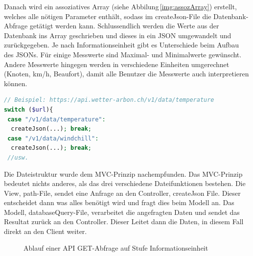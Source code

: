 \noindent
Danach wird ein assoziatives Array (siehe Abbilung\,\ref{img:assozArray}) erstellt, welches alle nötigen Parameter enthält, sodass im createJson-File die Datenbank-Abfrage getätigt werden kann. Schlussendlich werden die Werte aus der Datenbank ins Array geschrieben und dieses in ein JSON umgewandelt und zurückgegeben. Je nach Informationseinheit gibt es Unterschiede beim Aufbau des JSONs. Für einige Messwerte sind Maximal- und Minimalwerte gewünscht. Andere Messwerte hingegen werden in verschiedene Einheiten umgerechnet (Knoten, km/h, Beaufort), damit alle Benutzer die Messwerte auch interpretieren können.

\vspace{3mm}
\begin{lstlisting}[label=lst:switchCase,caption=Routing innerhalb einer Kategorie mittels Switch-case, language=php, style=php]
// Beispiel: https://api.wetter-arbon.ch/v1/data/temperature
switch ($url){
 case "/v1/data/temperature":
  createJson(...); break;
 case "/v1/data/windchill":
  createJson(...); break;
 //usw.
\end{lstlisting}
\vspace{3mm}


\noindent
Die Dateistruktur wurde dem MVC-Prinzip nachempfunden. Das MVC-Prinzip bedeutet nichts anderes, als das drei verschiedene Dateifunktionen bestehen. Die View, path-File, sendet eine Anfrage an den Controller, createJson File. Dieser entscheidet dann was alles benötigt wird und fragt dies beim Modell an. Das Modell, databaseQuery-File, verarbeitet die angefragten Daten und sendet das Resultat zurück an den Controller. Dieser Leitet dann die Daten, in diesem Fall direkt an den Client weiter.

\begin{figure}[htbp!]
	\centering
	\caption{Ablauf einer API GET-Abfrage auf Stufe Informationseinheit}
	\label{img:APIFiles}
\end{figure}





